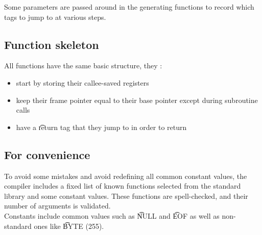 Some parameters are passed around in the generating functions to record which tags to jump to at various steps.

\subsection{Function skeleton}
All functions have the same basic structure, they :
\begin{itemize}
    \item start by storing their callee-saved registers
    \item keep their frame pointer equal to their base pointer except during subroutine calls
    \item have a \t{return} tag that they jump to in order to return
\end{itemize}

\subsection{For convenience}
To avoid some mistakes and avoid redefining all common constant values, the compiler includes a fixed list of known functions selected from the standard library and some constant values. These functions are spell-checked, and their number of arguments is validated.\\
Constants include common values such as \t{NULL} and \t{EOF} as well as non-standard ones like \t{BYTE} (255).
